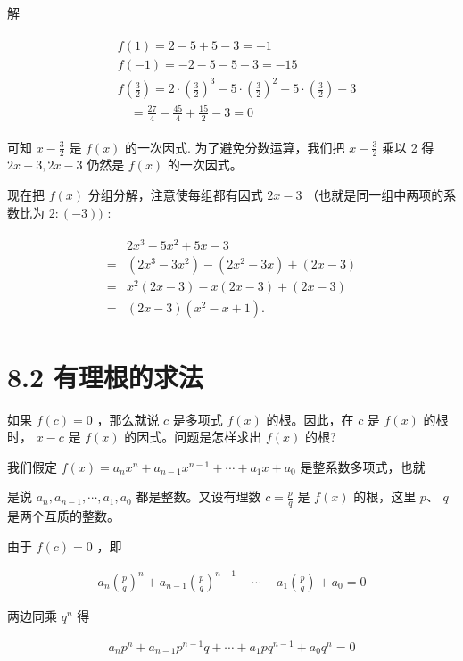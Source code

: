\documentclass[10pt]{article}
\begin{document}
解

\begin{align*}
\begin{aligned}
& f(1)=2-5+5-3=-1 \\
& f(-1)=-2-5-5-3=-15 \\
& f\left(\frac{3}{2}\right)=2 \cdot\left(\frac{3}{2}\right)^{3}-5 \cdot\left(\frac{3}{2}\right)^{2}+5 \cdot\left(\frac{3}{2}\right)-3 \\
& \quad=\frac{27}{4}-\frac{45}{4}+\frac{15}{2}-3=0
\end{aligned}
\end{align*}

可知 $x-\frac{3}{2}$ 是 $f(x)$ 的一次因式. 为了避免分数运算，我们把 $x-\frac{3}{2}$ 乘以 2 得 $2 x-3,2 x-3$ 仍然是 $f(x)$ 的一次因式。

现在把 $f(x)$ 分组分解，注意使每组都有因式 $2 x-3$ （也就是同一组中两项的系数比为 $2:(-3))$ :

\begin{align*}
\begin{aligned}
& 2 x^{3}-5 x^{2}+5 x-3 \\
= & \left(2 x^{3}-3 x^{2}\right)-\left(2 x^{2}-3 x\right)+(2 x-3) \\
= & x^{2}(2 x-3)-x(2 x-3)+(2 x-3) \\
= & (2 x-3)\left(x^{2}-x+1\right) .
\end{aligned}
\end{align*}

\section*{8.2 有理根的求法}
如果 $f(c)=0$ ，那么就说 $c$ 是多项式 $f(x)$ 的根。因此，在 $c$ 是 $f(x)$ 的根时， $x-c$ 是 $f(x)$ 的因式。问题是怎样求出 $f(x)$ 的根?

我们假定 $f(x)=a_{n} x^{n}+a_{n-1} x^{n-1}+\cdots+a_{1} x+a_{0}$ 是整系数多项式，也就

是说 $a_{n}, a_{n-1}, \cdots, a_{1}, a_{0}$ 都是整数。又设有理数 $c=\frac{p}{q}$ 是 $f(x)$ 的根，这里 $p 、$ $q$ 是两个互质的整数。

由于 $f(c)=0$ ，即

\begin{align*}
a_{n}\left(\frac{p}{q}\right)^{n}+a_{n-1}\left(\frac{p}{q}\right)^{n-1}+\cdots+a_{1}\left(\frac{p}{q}\right)+a_{0}=0
\end{align*}

两边同乘 $q^{n}$ 得

\begin{align*}
a_{n} p^{n}+a_{n-1} p^{n-1} q+\cdots+a_{1} p q^{n-1}+a_{0} q^{n}=0 \tag{2}
\end{align*}
\end{document}
